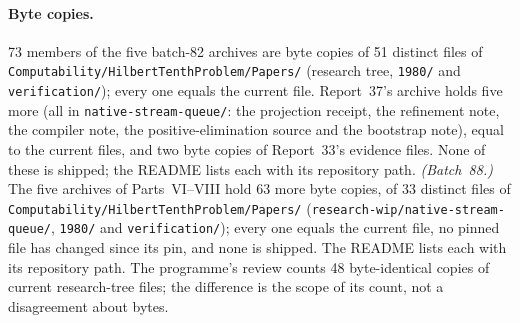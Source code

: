 \documentclass[11pt,letterpaper]{article}
\theoremstyle{definition}\newtheorem{definition}[theorem]{Definition}
\theoremstyle{remark}\newtheorem{remark}[theorem]{Remark}
\newcommand{\rw}[1]{\nolinkurl{#1}}%
\begin{document}
\paragraph{Byte copies.} 73 members of the five batch-82 archives are byte copies of 51 distinct files of \rw{Computability/HilbertTenthProblem/Papers/} (research tree, \rw{1980/} and \rw{verification/}); every one equals the current file. Report~37's archive holds five more (all in \rw{native-stream-queue/}: the projection receipt, the refinement note, the compiler note, the positive-elimination source and the bootstrap note), equal to the current files, and two byte copies of Report~33's evidence files. None of these is shipped; the README lists each with its repository path. \emph{(Batch~88.)} The five archives of Parts~VI--VIII hold 63 more byte copies, of 33 distinct files of \rw{Computability/HilbertTenthProblem/Papers/} (\rw{research-wip/native-stream-queue/}, \rw{1980/} and \rw{verification/}); every one equals the current file, no pinned file has changed since its pin, and none is shipped. The README lists each with its repository path. The programme's review counts 48 byte-identical copies of current research-tree files; the difference is the scope of its count, not a disagreement about bytes.
\end{document}
